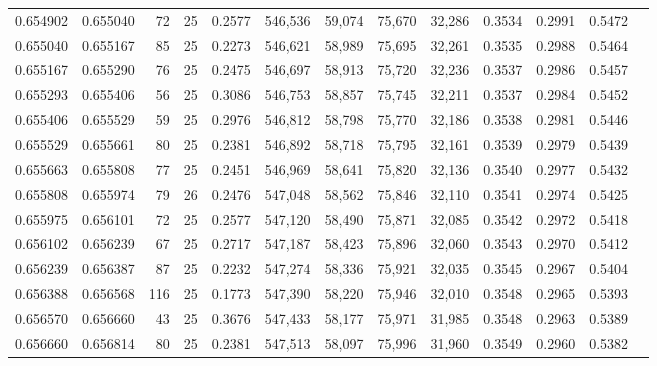 \begin{tabular}{rrrrrrrrrrrrr}
0.654902 & 0.655040 &    72 &  25 &                                     0.2577 & 546,536 &  59,074 &  75,670 &  32,286 & 0.3534 & 0.2991 & 0.5472 \\
0.655040 & 0.655167 &    85 &  25 &                                     0.2273 & 546,621 &  58,989 &  75,695 &  32,261 & 0.3535 & 0.2988 & 0.5464 \\
0.655167 & 0.655290 &    76 &  25 &                                     0.2475 & 546,697 &  58,913 &  75,720 &  32,236 & 0.3537 & 0.2986 & 0.5457 \\
0.655293 & 0.655406 &    56 &  25 &                                     0.3086 & 546,753 &  58,857 &  75,745 &  32,211 & 0.3537 & 0.2984 & 0.5452 \\
0.655406 & 0.655529 &    59 &  25 &                                     0.2976 & 546,812 &  58,798 &  75,770 &  32,186 & 0.3538 & 0.2981 & 0.5446 \\
0.655529 & 0.655661 &    80 &  25 &                                     0.2381 & 546,892 &  58,718 &  75,795 &  32,161 & 0.3539 & 0.2979 & 0.5439 \\
0.655663 & 0.655808 &    77 &  25 &                                     0.2451 & 546,969 &  58,641 &  75,820 &  32,136 & 0.3540 & 0.2977 & 0.5432 \\
0.655808 & 0.655974 &    79 &  26 &                                     0.2476 & 547,048 &  58,562 &  75,846 &  32,110 & 0.3541 & 0.2974 & 0.5425 \\
0.655975 & 0.656101 &    72 &  25 &                                     0.2577 & 547,120 &  58,490 &  75,871 &  32,085 & 0.3542 & 0.2972 & 0.5418 \\
0.656102 & 0.656239 &    67 &  25 &                                     0.2717 & 547,187 &  58,423 &  75,896 &  32,060 & 0.3543 & 0.2970 & 0.5412 \\
0.656239 & 0.656387 &    87 &  25 &                                     0.2232 & 547,274 &  58,336 &  75,921 &  32,035 & 0.3545 & 0.2967 & 0.5404 \\
0.656388 & 0.656568 &   116 &  25 &                                     0.1773 & 547,390 &  58,220 &  75,946 &  32,010 & 0.3548 & 0.2965 & 0.5393 \\
0.656570 & 0.656660 &    43 &  25 &                                     0.3676 & 547,433 &  58,177 &  75,971 &  31,985 & 0.3548 & 0.2963 & 0.5389 \\
0.656660 & 0.656814 &    80 &  25 &                                     0.2381 & 547,513 &  58,097 &  75,996 &  31,960 & 0.3549 & 0.2960 & 0.5382 \\

\end{tabular}
